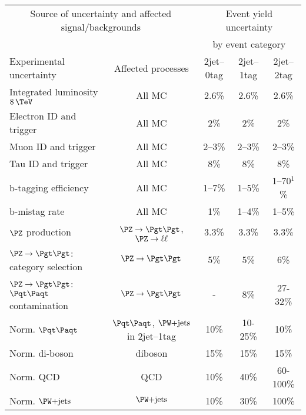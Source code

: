 
\begin{table}[tbhp]
\small
\begin{center}
    \begin{tabular}{|l|c|c|c|c|}
    \hline
    \multicolumn{2}{|c|}{Source of uncertainty and affected signal/backgrounds} & \multicolumn{3}{|c|}{Event yield uncertainty}  \\
    \multicolumn{2}{|c|}{} & \multicolumn{3}{|c|}{by event category} \\
    \hline
     Experimental uncertainty                                  & Affected processes &  2jet--0tag    &  2jet--1tag  &  2jet--2tag      \\
     \hline
     Integrated luminosity $8\,\TeV$                           & All MC & 2.6\% & 2.6\% & 2.6\%       \\
     Electron ID and trigger                                   & All MC &  2\%  & 2\%  & 2\%       \\
     Muon ID and trigger                                       & All MC & 2--3\%  &   2--3\%    & 2--3\%       \\
     Tau ID and trigger                                        & All MC & 8\%  & 8\% & 8\%           \\
     b-tagging efficiency                                      & All MC & 1--7\% & 1--5\%  & 1--70$^{1}$\% \\
     b-mistag rate                                             & All MC & 1\%  & 1--4\%  & 1--5\%       \\
     \hline
     $\PZ$ production                                          & $\ZToTauTau$, $\PZ\to\ell\ell$ & 3.3\%     &   3.3\%    & 3.3\%      \\
     $\PZ\to\Pgt\Pgt$: category selection                      & $\ZToTauTau$ & 5\%  & 5\% & 6\%        \\
     $\PZ\to\Pgt\Pgt$: $\ttbar$ contamination                  & $\ZToTauTau$ & - & 8\% & 27-32\%        \\
     Norm. $\ttbar$                                            & $\ttbar$, $\WJets$ in 2jet--1tag & 10\%  &   10-25\%  &  10\%        \\
     Norm. di-boson                                            & diboson & 15\%   &   15\%  &  15\%      \\
     Norm. QCD                                                 & QCD  & 10\%    &   40\% & 60-100\%         \\
     Norm. $\WJets$                                            & $\WJets$ & 10\% &  30\% & 100\%             \\

\end{tabular}
\end{center}
\end{table}
